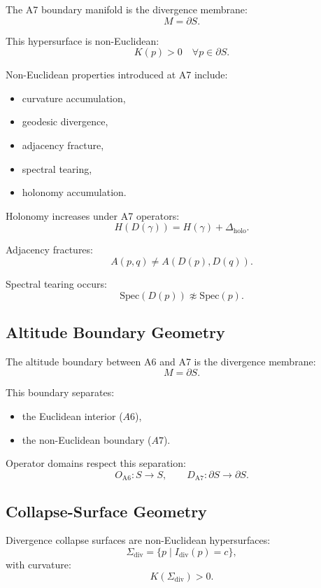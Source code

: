 The A7 boundary manifold is the divergence membrane:
\[
M = \partial S.
\]

This hypersurface is non-Euclidean:
\[
K(p) > 0 \quad \forall p \in \partial S.
\]

Non-Euclidean properties introduced at A7 include:
\begin{itemize}
  \item curvature accumulation,
  \item geodesic divergence,
  \item adjacency fracture,
  \item spectral tearing,
  \item holonomy accumulation.
\end{itemize}

Holonomy increases under A7 operators:
\[
H(D(\gamma)) = H(\gamma) + \Delta_{\mathrm{holo}}.
\]

Adjacency fractures:
\[
A(p,q) \ne A(D(p), D(q)).
\]

Spectral tearing occurs:
\[
\mathrm{Spec}(D(p)) \not\approx \mathrm{Spec}(p).
\]

\subsection{Altitude Boundary Geometry}

The altitude boundary between A6 and A7 is the divergence membrane:
\[
M = \partial S.
\]

This boundary separates:
\begin{itemize}
  \item the Euclidean interior ($A6$),
  \item the non-Euclidean boundary ($A7$).
\end{itemize}

Operator domains respect this separation:
\[
O_{\mathrm{A6}} : S \to S,
\qquad
D_{\mathrm{A7}} : \partial S \to \partial S.
\]

\subsection{Collapse-Surface Geometry}

Divergence collapse surfaces are non-Euclidean hypersurfaces:
\[
\Sigma_{\mathrm{div}} = \{ p \mid I_{\mathrm{div}}(p) = c \},
\]
with curvature:
\[
K(\Sigma_{\mathrm{div}}) > 0.
\]

